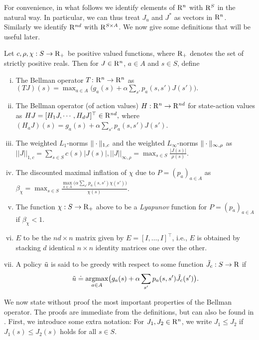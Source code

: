 For convenience, in what follows we identify elements of $\mathrm{R}^n$ with $\mathrm{R}^S$ in the natural way. In particular, we can thus treat $J_u$ and $J^*$ as vectors in $\mathrm{R}^n$. Similarly we identify $\mathrm{R}^{nd}$ with $\mathrm{R}^{S\times A}$.
We now give some definitions that will be useful later.
\begin{definition}
Let $c,\rho,\chi:S \to \mathrm{R}_+$ be positive valued functions, where $\mathrm{R}_+$ denotes the set of strictly positive reals. Then for $J\in \mathrm{R}^n$, $a\in A$ and $s\in S$, 
define
\begin{enumerate}[(i)]
\item The Bellman operator $T\colon \mathrm{R}^n \rightarrow \mathrm{R}^n$ as $(TJ)(s)=\max_{a \in A}\big(g_a(s)+\alpha \sum_{s'} p_a(s,s')J(s')\big).
$
\item \label{bellactval} The Bellman operator (of action values) $H: \mathrm{R}^n \to \mathrm{R}^{nd}$ for state-action values as $HJ=[ H_1 J,\cdots,H_d J]^\top\in \mathrm{R}^{nd},$ where $(H_a J)(s)= g_a(s)+\alpha \sum_{s'}p_a(s,s') J(s')$.
\item The weighted $L_1$-norms $\|\cdot\|_{1,c}$ 
and 
the weighted $L_\infty$-norms  $\|\cdot\|_{\infty,\rho}$ as $
||J||_{1,c}=\sum_{s \in S} c(s)|J(s)|, 
||J||_{\infty,\rho}=\max_{s \in S} \frac{|J(s)|}{\rho(s)}$.
\item The discounted maximal inflation of $\chi$ due to $P = (p_a)_{a\in A}$ as $\beta_{\chi}=\max_{s \in S} \frac{\underset{a \in A}{\max}\big(\alpha\sum_{s'}p_a(s,s')\chi(s')\big)}{\chi(s)}$.
\item The function $\chi:S\to\mathrm{R}_+$ above to be a \emph{Lyapunov} function for $P = (p_a)_{a\in A}$ if $\beta_{\chi}<1$.
\item $E$ to be the $nd\times n$ matrix given by $E=[I,\ldots,I]^\top$, i.e., $E$ is obtained by stacking $d$ identical $n\times n$ identity matrices one over the other.
\item A policy $\tilde{u}$ is said to be greedy with respect to some function $\tilde{J}_c:S \to \mathrm{R}$ if \begin{align*}\tilde{u}\doteq\underset{a\in A}{\operatorname{argmax}}\big(g_a(s)+\alpha \sum_{s'}p_a(s,s')\tilde{J}_c(s')\big).\end{align*}
\end{enumerate}
\end{definition}
We now state without proof the most important properties of the Bellman operator.
The proofs are immediate from the definitions, but can also be found in \cite{BertB}.
First, we introduce some extra notation:
For $J_1,J_2\in \mathrm{R}^n$, we write $J_1\le J_2$ if $J_1(s)\le J_2(s)$ holds for all $s\in S$.
